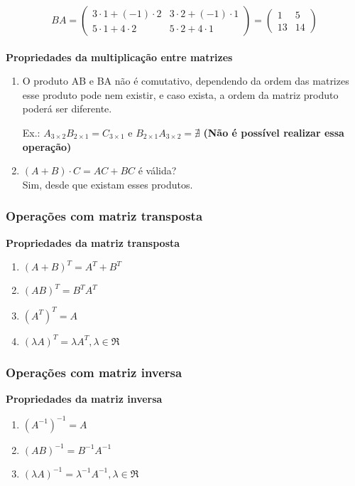 \documentclass[12pt]{article}
\begin{document}
\[
BA =
    \begin{pmatrix}
        3 \cdot 1 + (-1) \cdot 2 & 3 \cdot 2 + (-1) \cdot 1 \\
        5 \cdot 1 + 4 \cdot 2 & 5 \cdot 2 + 4 \cdot 1
    \end{pmatrix}
=
    \begin{pmatrix}
         1  &  5 \\
        13  &  14
    \end{pmatrix}
\]
\\
\noindent
\textbf{Propriedades da multiplicação entre matrizes}
\begin{enumerate}[label=\textbf{\alph*)}]
    \item O produto AB e BA não é comutativo, dependendo da ordem das matrizes esse produto pode nem existir,
    e caso exista, a ordem da matriz produto poderá ser diferente.

    Ex.: \( A_{3 \times 2} B_{2 \times 1} = C_{3 \times 1}\) e \( B_{2 \times 1} A_{3 \times 2} = \nexists\)
    \textbf{(Não é possível realizar essa operação)}
    \item \((A+B) \cdot C = AC+BC\) é válida? \\
    Sim, desde que existam esses produtos.
\end{enumerate}

\subsubsection{Operações com matriz transposta}
\noindent
\textbf{Propriedades da matriz transposta}
\begin{enumerate}[label=\textbf{\alph*)}]
    \item $(A + B)^T = A^T + B^T$
    \item $(AB)^T = B^T A^T$
    \item $(A^T)^T = A$
    \item $(\lambda A)^T = \lambda A^T, \lambda \in \Re$
\end{enumerate}

\subsubsection{Operações com matriz inversa}
\noindent
\textbf{Propriedades da matriz inversa}
\begin{enumerate}[label=\textbf{\alph*)}]
    \item $(A^{-1})^{-1} = A$
    \item $(AB)^{-1} = B^{-1} A^{-1}$
    \item $(\lambda A)^{-1} = \lambda^{-1} A^{-1}, \lambda \in \Re$
\end{enumerate}
\end{document}
